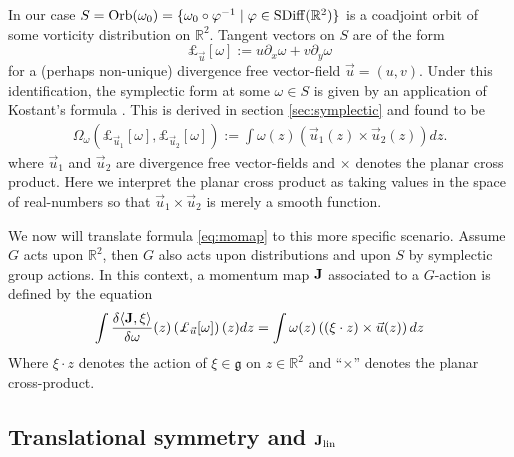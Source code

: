 \documentclass[12pt]{amsart}
\newcommand{\R}{\ensuremath{\mathbb{R}}}
\theoremstyle{remark}
\DeclareMathOperator{\SDiff}{SDiff}
\begin{document}
In our case $S = {\rm Orb}(\omega_0) = \{ \omega_0 \circ \varphi^{-1} \mid \varphi \in \SDiff(\mathbb{R}^2) \}$ is a coadjoint orbit of some vorticity distribution on $\mathbb{R}^2$.
Tangent vectors on $S$ are of the form $$\pounds_{\vec{u}} [\omega] := u \partial_x \omega + v \partial_y \omega$$ for a (perhaps non-unique) divergence free vector-field $\vec{u} = (u,v)$.
Under this identification, the symplectic form at some $\omega \in S$ is given by an application of Kostant's formula \cite{FOM}.
This is derived in section \ref{sec:symplectic} and found to be
\begin{align*}
  \Omega_\omega( \pounds_{\vec{u}_1}[\omega] , \pounds_{\vec{u}_2} [\omega] ) :=
  \int \omega(z) ( \vec{u}_1(z) \times \vec{u}_2(z) ) dz.
\end{align*}
where $\vec{u}_1$ and $\vec{u}_2$ are divergence free vector-fields and $\times$ denotes the planar cross product.
Here we interpret the planar cross product as taking values in the space of real-numbers so that $\vec{u}_1 \times \vec{u}_2$ is
merely a smooth function.

We now will translate formula \eqref{eq:momap} to this more specific scenario.
Assume $G$ acts upon $\mathbb{R}^2$, then $G$ also acts upon distributions and upon $S$ by symplectic group actions.
In this context, a momentum map ${\bf J}$ associated to a $G$-action is defined by the equation
\begin{align}
  \int \frac{\delta  \langle {\bf J} , \xi \rangle }{\delta \omega} (z)  \left( \pounds_{\vec{u}}[\omega] \right)(z) dz = \int \omega(z)  \left( (\xi \cdot z) \times \vec{u}(z) \right)dz \label{eq:momap2}
\end{align}
Where $\xi \cdot z$ denotes the action of $\xi \in \mathfrak{g}$ on $z \in \R^2$
and ``$\times$'' denotes the planar cross-product.

\subsection{Translational symmetry and ${\bf J}_{\rm lin}$}
\end{document}
